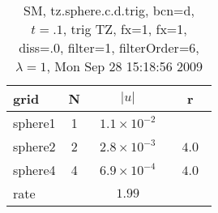 \begin{table}[hbt]\tableFont %
\begin{center}
\begin{tabular}{|l|c|c|c|} \hline 
grid  & N &  $\vert u \vert$   & r \\ \hline 
             sphere1 &     1 & ~$1.1\times10^{ -2}$~ &            \\ \hline
             sphere2 &     2 & ~$2.8\times10^{ -3}$~ & ~$  4.0$~  \\ \hline
             sphere4 &     4 & ~$6.9\times10^{ -4}$~ & ~$  4.0$~  \\ \hline
    rate             &       &       $1.99$         &        \\ \hline
\end{tabular}
\caption{SM, tz.sphere.c.d.trig, bcn=d, $t=.1$, trig TZ, fx=1, fx=1, diss=.0, filter=1, filterOrder=6, $\lambda=1$, Mon Sep 28 15:18:56 2009}\label{table:tz.sphere.c.d.trig}
\end{center}
\end{table}
